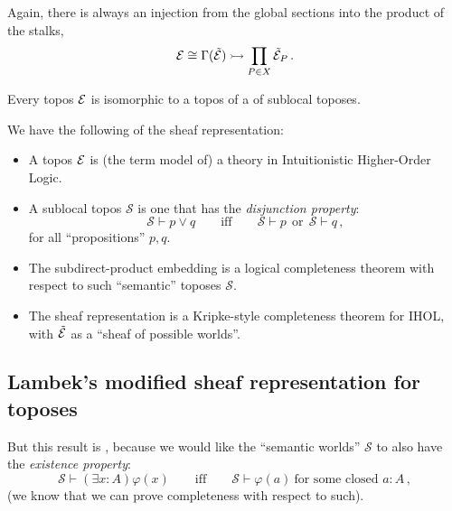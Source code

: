 \documentclass[lambek.tex]{subfiles}
\begin{document}
Again, there is always an injection from the global sections into the product of the stalks,
\[
\mathcal{E} \cong \Gamma(\tilde{\mathcal{E}}) \rightarrowtail \prod_{P\in X}\tilde{\mathcal{E}}_P\,.
\]

\begin{corollary}
Every topos $\mathcal{E}$ is isomorphic to a topos of a  of sublocal toposes.
\end{corollary}



We have the following  of the sheaf representation:
%
\begin{itemize}
\item A topos $\mathcal{E}$ is (the term model of) a theory in Intuitionistic Higher-Order Logic.
\item A sublocal topos $\mathcal{S}$ is one that has the \emph{disjunction property}:
\[
\mathcal{S}\vdash p\vee q \qquad\text{iff}\qquad \mathcal{S}\vdash p\  \ \text{or}\  \ \mathcal{S}\vdash q\,,
\]
for all ``propositions'' $p, q$.
\item  The subdirect-product embedding is a logical completeness theorem with respect to such ``semantic'' toposes $\mathcal{S}$.
\item The sheaf representation is a Kripke-style completeness theorem for IHOL, with $\tilde{\mathcal{E}}$ as a ``sheaf of possible worlds''.
\end{itemize}

\subsection{Lambek's modified sheaf representation for toposes}

But this result is , because we would like the ``semantic worlds'' $\mathcal{S}$ to also have the \emph{existence property}:
\[
\mathcal{S}\vdash (\exists x:A)\varphi(x) \qquad\text{iff}\qquad  \mathcal{S}\vdash \varphi(a)\ \text{for some closed $a:A$}\,,
\] 
(we know that we can prove completeness with respect to such).
\medskip
\end{document}
